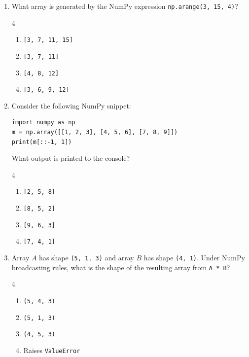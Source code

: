\documentclass[11pt,a4paper]{article}
\begin{document}
\newpage
\begin{enumerate}[leftmargin=*,itemsep=2.5pt,resume]

\item What array is generated by the NumPy expression \texttt{np.arange(3, 15, 4)}?
\begin{multicols}{4}
\begin{enumerate}[label=\Alph*.]
  \item \texttt{[3, 7, 11, 15]}
  \item \texttt{[3, 7, 11]}
  \item \texttt{[4, 8, 12]}
  \item \texttt{[3, 6, 9, 12]}
\end{enumerate}
\end{multicols}

\item Consider the following NumPy snippet:
\begin{lstlisting}
import numpy as np
m = np.array([[1, 2, 3], [4, 5, 6], [7, 8, 9]])
print(m[::-1, 1])
\end{lstlisting}
What output is printed to the console?
\begin{multicols}{4}
\begin{enumerate}[label=\Alph*.]
  \item \texttt{[2, 5, 8]}
  \item \texttt{[8, 5, 2]}
  \item \texttt{[9, 6, 3]}
  \item \texttt{[7, 4, 1]}
\end{enumerate}
\end{multicols}

\item Array $A$ has shape \texttt{(5, 1, 3)} and array $B$ has shape \texttt{(4, 1)}. Under NumPy broadcasting rules, what is the shape of the resulting array from \texttt{A * B}?
\begin{multicols}{4}
\begin{enumerate}[label=\Alph*.]
  \item \texttt{(5, 4, 3)}
  \item \texttt{(5, 1, 3)}
  \item \texttt{(4, 5, 3)}
  \item Raises \texttt{ValueError}
\end{enumerate}
\end{multicols}


\end{enumerate}
\end{document}

